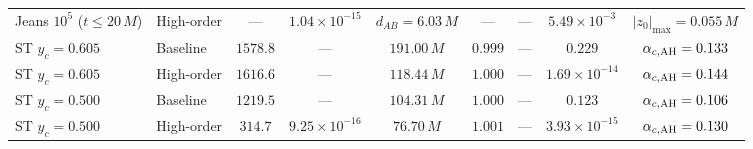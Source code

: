 \begin{table}[tbp]
\begin{ruledtabular}
\begin{tabular}{llccccccc}
Jeans $10^5$ ($t \le 20\,M$) & High-order & --- & $1.04 \times 10^{-15}$ & $d_{AB}=6.03\,M$ & --- & --- & $5.49 \times 10^{-3}$ & $|z_0|_{\max} = 0.055\,M$ \\
ST $y_c = 0.605$ & Baseline & $1578.8$ & --- & $191.00\,M$ & $0.999$ & --- & $0.229$ & $\alpha_{c,\rm AH} = 0.133$ \\
ST $y_c = 0.605$ & High-order & $1616.6$ & --- & $118.44\,M$ & $1.000$ & --- & $1.69 \times 10^{-14}$ & $\alpha_{c,\rm AH} = 0.144$ \\
ST $y_c = 0.500$ & Baseline & $1219.5$ & --- & $104.31\,M$ & $1.000$ & --- & $0.123$ & $\alpha_{c,\rm AH} = 0.106$ \\
ST $y_c = 0.500$ & High-order & $314.7$ & $9.25 \times 10^{-16}$ & $76.70\,M$ & $1.001$ & --- & $3.93 \times 10^{-15}$ & $\alpha_{c,\rm AH} = 0.130$ \\
\end{tabular}
\end{ruledtabular}
\end{table}

